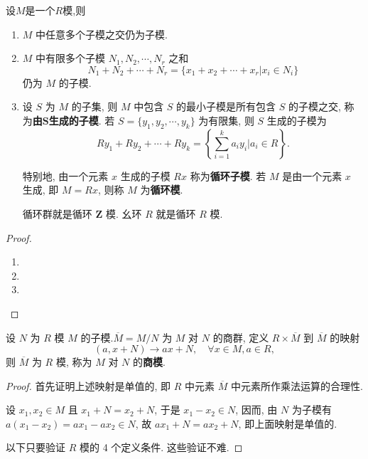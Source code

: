 \documentclass[../../main.tex]{subfiles}
\begin{document}
\begin{theorem}
设$M$是一个$R$模,则
\begin{enumerate}[(1)]
\item \( M \) 中任意多个子模之交仍为子模.

\item \( M \) 中有限多个子模 \( N_1, N_2, \cdots, N_r \) 之和
\[
N_1 + N_2 + \cdots + N_r = \{x_1 + x_2 + \cdots + x_r | x_i \in N_i\}
\]
仍为 \( M \) 的子模.

\item 设 \( S \) 为 \( M \) 的子集, 则 \( M \) 中包含 \( S \) 的最小子模是所有包含 \( S \) 的子模之交, 称为\textbf{由\(\boldsymbol{S}\)生成的子模}. 若 \( S = \{y_1, y_2, \cdots, y_k\} \) 为有限集, 则 \( S \) 生成的子模为
\[
Ry_1 + Ry_2 + \cdots + Ry_k = \left\{ \sum_{i=1}^k a_i y_i \bigg| a_i \in R \right\}.
\]

特别地, 由一个元素 \( x \) 生成的子模 \( Rx \) 称为\textbf{循环子模}. 若 \( M \) 是由一个元素 \( x \) 生成, 即 \( M = Rx \), 则称 \( M \) 为\textbf{循环模}.

循环群就是循环 \( \mathbf{Z} \) 模. 幺环 \( R \) 就是循环 \( R \) 模.
\end{enumerate}
\end{theorem}
\begin{proof}
\begin{enumerate}[(1)]
\item 

\item 

\item 
\end{enumerate}

\end{proof}

\begin{theorem}
设 \( N \) 为 \( R \) 模 \( M \) 的子模.\( \overline{M} = M/N \) 为 \( M \) 对 \( N \) 的商群, 定义 \( R \times \overline{M} \) 到 \( \overline{M} \) 的映射
\[
(a, x + N) \to ax + N, \quad \forall x \in M, a \in R,
\]
则 \( \overline{M} \) 为 \( R \) 模, 称为 \( M \) 对 \( N \) 的\textbf{商模}.
\end{theorem}
\begin{proof}
首先证明上述映射是单值的, 即 \( R \) 中元素 \( \overline{M} \) 中元素所作乘法运算的合理性.

设 \( x_1, x_2 \in M \) 且 \( x_1 + N = x_2 + N \), 于是 \( x_1 - x_2 \in N \), 因而, 由 \( N \) 为子模有 \( a(x_1 - x_2) = ax_1 - ax_2 \in N \), 故 \( ax_1 + N = ax_2 + N \), 即上面映射是单值的.

以下只要验证 \( R \) 模的 4 个定义条件. 这些验证不难.

\end{proof}
\end{document}

